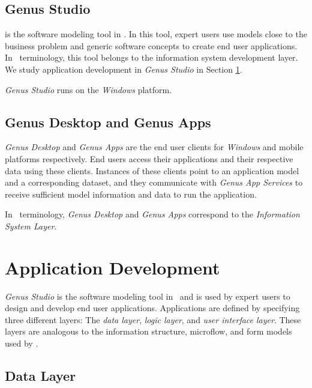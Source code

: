 \subsection{Genus Studio}
\label{sub:Genus Studio}
 is the software modeling tool in \gap. In this tool, expert users use models close to the business problem and generic software concepts to create end user applications. In \mde~terminology, this tool belongs to the information system development layer. We study application development in \textit{Genus Studio} in Section \ref{sec:Application Development}.

\textit{Genus Studio} runs on the \textit{Windows} platform.

\subsection{Genus Desktop and Genus Apps}
\label{sub:Genus Desktop and Genus Apps}
\textit{Genus Desktop} and \textit{Genus Apps} are the end user clients for \textit{Windows} and mobile platforms respectively. End users access their applications and their respective data using these clients. Instances of these clients point to an application model and a corresponding dataset, and they communicate with \textit{Genus App Services} to receive sufficient model information and data to run the application. 

In \mdd~terminology, \textit{Genus Desktop} and \textit{Genus Apps} correspond to the \textit{Information System Layer}.

\section{Application Development}
\label{sec:Application Development}
\textit{Genus Studio} is the software modeling tool in \gap~and is used by expert users to design and develop end user applications. Applications are defined by specifying three different layers: The \textit{data layer}, \textit{logic layer}, and \textit{user interface layer}. These layers are analogous to the information structure, microflow, and form models used by \mendix.

\subsection{Data Layer}
\label{sub:Data Layer}

